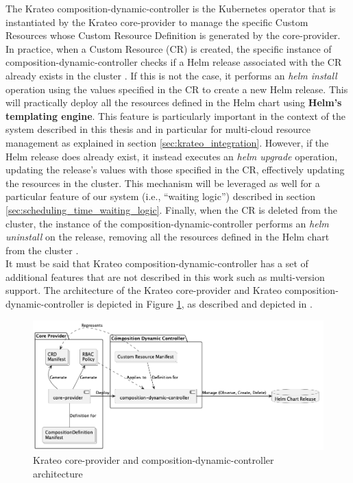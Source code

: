 The Krateo composition-dynamic-controller is the Kubernetes operator that is instantiated by the Krateo core-provider to manage the specific Custom Resources whose Custom Resource Definition is generated by the core-provider.
In practice, when a Custom Resource (CR) is created, the specific instance of composition-dynamic-controller checks if a Helm release associated with the CR already exists in the cluster \cite{krateo_composition_dynamic_controller}. 
If this is not the case, it performs an \textit{helm install} operation using the values specified in the CR to create a new Helm release. This will practically deploy all the resources defined in the Helm chart using \textbf{Helm's templating engine}.
This feature is particularly important in the context of the system described in this thesis and in particular for multi-cloud resource management as explained in section \ref{sec:krateo_integration}.
However, if the Helm release does already exist, it instead executes an \textit{helm upgrade} operation, updating the release's values with those specified in the CR, effectively updating the resources in the cluster.
This mechanism will be leveraged as well for a particular feature  of our system (i.e., ``waiting logic'') described in section \ref{sec:scheduling_time_waiting_logic}.
Finally, when the CR is deleted from the cluster, the instance of the composition-dynamic-controller performs an \textit{helm uninstall} on the release, removing all the resources defined in the Helm chart from the cluster \cite{krateo_composition_dynamic_controller}. \\
It must be said that Krateo composition-dynamic-controller has a set of additional features that are not described in this work such as multi-version support.
The architecture of the Krateo core-provider and Krateo composition-dynamic-controller is depicted in Figure \ref{fig:krateo_core_provider}, as described and depicted in \cite{krateo_core_provider}.

\begin{figure}[htb]
    \centering
    \includegraphics[width=1\linewidth]{images/kraeto_core_provider.png}
    \caption{Krateo core-provider and composition-dynamic-controller architecture \cite{krateo_core_provider}}
    \label{fig:krateo_core_provider}
\end{figure}

